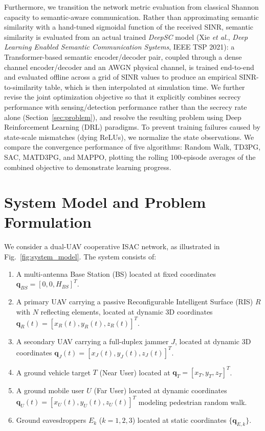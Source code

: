\documentclass[journal,onecolumn]{IEEEtran}
\begin{document}
Furthermore, we transition the network metric evaluation from classical Shannon capacity to semantic-aware communication. Rather than approximating semantic similarity with a hand-tuned sigmoidal function of the received SINR, semantic similarity is evaluated from an actual trained \emph{DeepSC} model (Xie \emph{et al.}, \emph{Deep Learning Enabled Semantic Communication Systems}, IEEE TSP 2021): a Transformer-based semantic encoder/decoder pair, coupled through a dense channel encoder/decoder and an AWGN physical channel, is trained end-to-end and evaluated offline across a grid of SINR values to produce an empirical SINR-to-similarity table, which is then interpolated at simulation time. We further revise the joint optimization objective so that it explicitly combines secrecy performance with sensing/detection performance rather than the secrecy rate alone (Section~\ref{sec:problem}), and resolve the resulting problem using Deep Reinforcement Learning (DRL) paradigms. To prevent training failures caused by state-scale mismatches (dying ReLUs), we normalize the state observations. We compare the convergence performance of five algorithms: Random Walk, TD3PG, SAC, MATD3PG, and MAPPO, plotting the rolling 100-episode averages of the combined objective to demonstrate learning progress.

\section{System Model and Problem Formulation}

We consider a dual-UAV cooperative ISAC network, as illustrated in Fig.~\ref{fig:system_model}. The system consists of:
\begin{enumerate}
    \item A multi-antenna Base Station (BS) located at fixed coordinates $\mathbf{q}_{BS} = [0, 0, H_{BS}]^T$.
    \item A primary UAV carrying a passive Reconfigurable Intelligent Surface (RIS) $R$ with $N$ reflecting elements, located at dynamic 3D coordinates $\mathbf{q}_R(t) = [x_R(t), y_R(t), z_R(t)]^T$.
    \item A secondary UAV carrying a full-duplex jammer $J$, located at dynamic 3D coordinates $\mathbf{q}_J(t) = [x_J(t), y_J(t), z_J(t)]^T$.
    \item A ground vehicle target $T$ (Near User) located at $\mathbf{q}_T = [x_T, y_T, z_T]^T$.
    \item A ground mobile user $U$ (Far User) located at dynamic coordinates $\mathbf{q}_U(t) = [x_U(t), y_U(t), z_U(t)]^T$ modeling pedestrian random walk.
    \item Ground eavesdroppers $E_k$ ($k=1,2,3$) located at static coordinates $\{\mathbf{q}_{E,k}\}$.
\end{enumerate}
\end{document}
